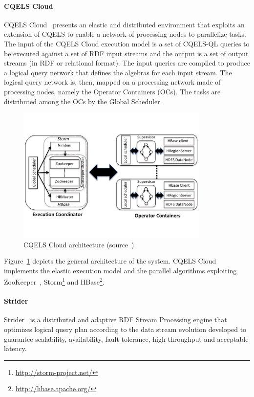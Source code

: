 \paragraph{CQELS Cloud}
CQELS Cloud~\cite{DBLP:conf/semweb/PhuocQVH13} presents an elastic and distributed environment that exploits an extension of CQELS to enable a network of processing nodes to parallelize tasks.
The input of the CQELS Cloud execution model is a set of CQELS-QL queries to be executed against a set of RDF input streams and the output is a set of output streams (in RDF or relational format).
The input queries are compiled to produce a logical query network that defines the algebras for each input stream. The logical query network is, then, mapped on a processing network made of processing nodes, namely the Operator Containers (OCs). The tasks are distributed among the OCs by the Global Scheduler.

\begin{figure}[t]
\begin{center}
\includegraphics[width=0.85\textwidth]{img/cqels-cloud}
\caption{CQELS Cloud architecture (source~\cite{DBLP:conf/semweb/PhuocQVH13}).}
\label{fig:cqels-cloud}
\end{center}
\end{figure}

Figure~\ref{fig:cqels-cloud} depicts the general architecture of the system. CQELS Cloud implements the elastic execution model and the parallel algorithms exploiting ZooKeeper~\cite{DBLP:conf/usenix/HuntKJR10}, Storm\footnote{\url{http://storm-project.net/}} and HBase\footnote{\url{http://hbase.apache.org/}}. 

\paragraph{Strider}
Strider~\cite{DBLP:conf/semweb/RenC17} is a distributed and adaptive RDF Stream Processing engine that optimizes logical query plan according to the data stream evolution developed to guarantee scalability, availability, fault-tolerance, high throughput and acceptable latency. 

